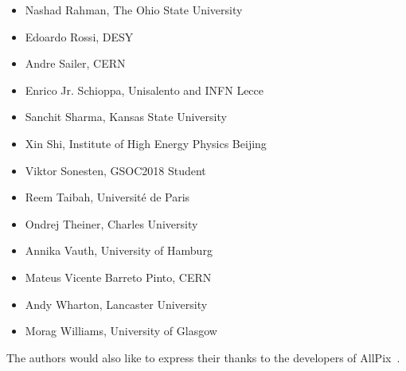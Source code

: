 \begin{itemize}
\item Nashad Rahman, The Ohio State University
\item Edoardo Rossi, DESY
\item Andre Sailer, CERN
\item Enrico Jr. Schioppa, Unisalento and INFN Lecce
\item Sanchit Sharma, Kansas State University
\item Xin Shi, Institute of High Energy Physics Beijing
\item Viktor Sonesten, GSOC2018 Student
\item Reem Taibah, Université de Paris
\item Ondrej Theiner, Charles University
\item Annika Vauth, University of Hamburg
\item Mateus Vicente Barreto Pinto, CERN
\item Andy Wharton, Lancaster University
\item Morag Williams, University of Glasgow
\end{itemize}

The authors would also like to express their thanks to the developers of AllPix~\cite{ap1wiki,ap1git}.
